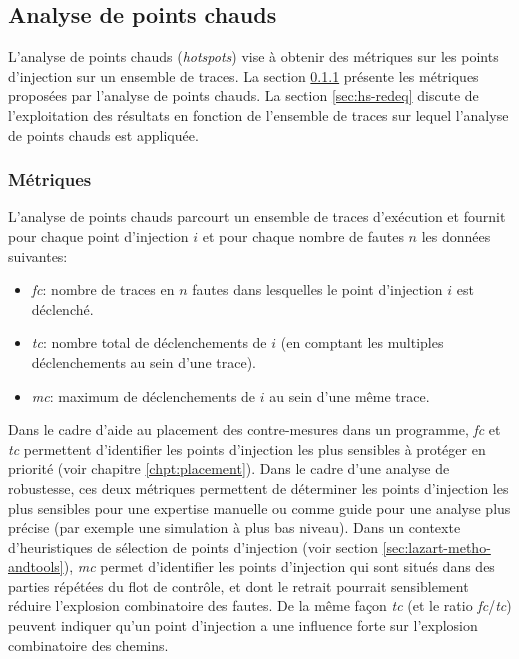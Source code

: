         \subsection{Analyse de points chauds}
        \label{sec:hotspots}
            
            L'analyse de points chauds (\textit{hotspots}) vise à obtenir des métriques sur les points d'injection sur un ensemble de traces. 
            La section \ref{sec:hs-metrics} présente les métriques proposées par l'analyse de points chauds. 
            La section \ref{sec:hs-redeq} discute de l'exploitation des résultats en fonction de l'ensemble de traces sur lequel l'analyse de points chauds est appliquée.
            
            \subsubsection{Métriques}
            \label{sec:hs-metrics}
            
                L'analyse de points chauds parcourt un ensemble de traces d'exécution et fournit pour chaque point d'injection $i$ et pour chaque nombre de fautes $n$ les données suivantes:
                \begin{itemize}
                    \item \textit{fc}: nombre de traces en $n$ fautes dans lesquelles le point d'injection $i$ est déclenché. 
                    \item \textit{tc}: nombre total de déclenchements de $i$ (en comptant les multiples déclenchements au sein d'une trace).
                    \item \textit{mc}: maximum de déclenchements de $i$ au sein d'une même trace.
                \end{itemize}
                
                Dans le cadre d'aide au placement des contre-mesures dans un programme, \textit{fc} et \textit{tc} permettent d'identifier les points d'injection les plus sensibles à protéger en priorité (voir chapitre \ref{chpt:placement}). 
                Dans le cadre d'une analyse de robustesse, ces deux métriques permettent de déterminer les points d'injection les plus sensibles pour une expertise manuelle ou comme guide pour une analyse plus précise (par exemple une simulation à plus bas niveau).
                Dans un contexte d'heuristiques de sélection de points d'injection (voir section \ref{sec:lazart-metho-andtools}), \textit{mc} permet d'identifier les points d'injection qui sont situés dans des parties répétées du flot de contrôle, et dont le retrait pourrait sensiblement réduire l'explosion combinatoire des fautes.
                De la même façon \textit{tc} (et le ratio \textit{fc}/\textit{tc}) peuvent indiquer qu'un point d'injection a une influence forte sur l'explosion combinatoire des chemins.
            

